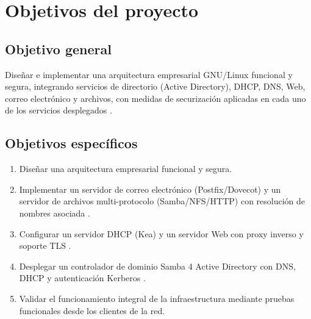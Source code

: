 
\section{Objetivos del proyecto}

\subsection{Objetivo general}

Diseñar e implementar una arquitectura empresarial GNU/Linux funcional y
segura, integrando servicios de directorio (Active Directory), DHCP, DNS,
Web, correo electrónico y archivos, con medidas de securización aplicadas en
cada uno de los servicios desplegados \cite{nemeth2017}.

\subsection{Objetivos específicos}

\begin{enumerate}
  \item Diseñar una arquitectura empresarial funcional y segura.
  \item Implementar un servidor de correo electrónico (Postfix/Dovecot) y un
        servidor de archivos multi-protocolo (Samba/NFS/HTTP) con resolución
        de nombres asociada \cite{postel1982}.
  \item Configurar un servidor DHCP (Kea) y un servidor Web con proxy
        inverso y soporte TLS \cite{rfc2131, keaDocs}.
  \item Desplegar un controlador de dominio Samba 4 Active Directory con
        DNS, DHCP y autenticación Kerberos \cite{sambateam2024, rfc4120}.
  \item Validar el funcionamiento integral de la infraestructura mediante
        pruebas funcionales desde los clientes de la red.
\end{enumerate}
